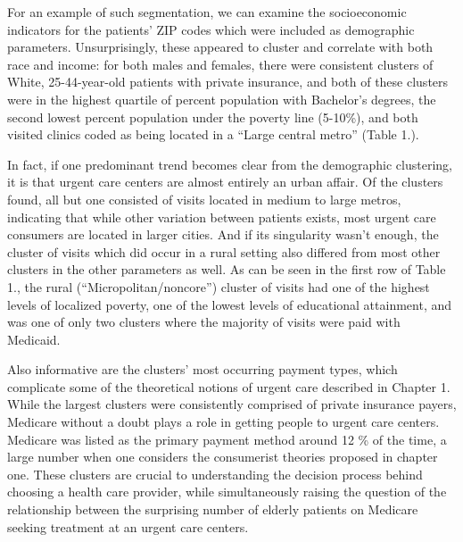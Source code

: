 \documentclass[12pt,twoside]{reedthesis}
\begin{document}
  For an example of such segmentation, we can examine the socioeconomic
  indicators for the patients' ZIP codes which were included as
  demographic parameters. Unsurprisingly, these appeared to cluster and
  correlate with both race and income: for both males and females, there
  were consistent clusters of White, 25-44-year-old patients with private
  insurance, and both of these clusters were in the highest quartile of
  percent population with Bachelor's degrees, the second lowest percent
  population under the poverty line (5-10\%), and both visited clinics
  coded as being located in a ``Large central metro'' (Table 1.).
  
  In fact, if one predominant trend becomes clear from the demographic
  clustering, it is that urgent care centers are almost entirely an urban
  affair. Of the clusters found, all but one consisted of visits located
  in medium to large metros, indicating that while other variation between
  patients exists, most urgent care consumers are located in larger
  cities. And if its singularity wasn't enough, the cluster of visits
  which did occur in a rural setting also differed from most other
  clusters in the other parameters as well. As can be seen in the first
  row of Table 1., the rural (``Micropolitan/noncore'') cluster of visits
  had one of the highest levels of localized poverty, one of the lowest
  levels of educational attainment, and was one of only two clusters where
  the majority of visits were paid with Medicaid.
  
  Also informative are the clusters' most occurring payment types, which
  complicate some of the theoretical notions of urgent care described in
  Chapter 1. While the largest clusters were consistently comprised of
  private insurance payers, Medicare without a doubt plays a role in
  getting people to urgent care centers. Medicare was listed as the
  primary payment method around 12 \% of the time, a large number when one
  considers the consumerist theories proposed in chapter one. These
  clusters are crucial to understanding the decision process behind
  choosing a health care provider, while simultaneously raising the
  question of the relationship between the surprising number of elderly
  patients on Medicare seeking treatment at an urgent care centers.
  
\end{document}
